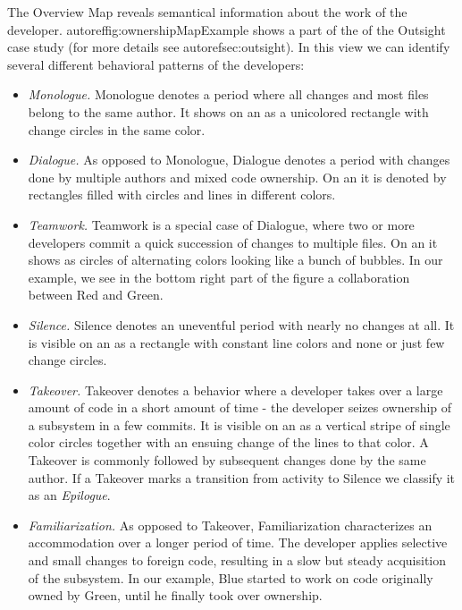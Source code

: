 \documentclass[10pt]{book}
\begin{document}
The Overview Map reveals semantical information about the work of the developer. autoref{fig:ownershipMapExample} shows a part of the \omap of the Outsight case study (for more details see  autoref{sec:outsight}). In this view we can identify several different behavioral patterns of the developers:

\begin{itemize}

\item \emph{Monologue.} Monologue denotes a period where all changes and most files belong to the same author. It shows on an \omap as a unicolored rectangle with change circles in the same color.

\item \emph{Dialogue.} As opposed to Monologue, Dialogue denotes a period with changes done by multiple authors and mixed code ownership. On an \omap it is denoted by rectangles filled with circles and lines in different colors.

\item \emph{Teamwork.} Teamwork is a special case of Dialogue, where two or more developers commit a quick succession of changes to multiple files. On an \omap it shows as circles of alternating colors looking like a bunch of bubbles. In our example, we see in the bottom right part of the figure a collaboration between Red and Green.

\item \emph{Silence.} Silence denotes an uneventful period with nearly no changes at all. It is visible on an \omap as a rectangle with constant line colors and none or just few change circles.

\item \emph{Takeover.} Takeover denotes a behavior where a developer takes over a large amount of code in a short amount of time \-- \ie the developer seizes ownership of a subsystem in a few commits. It is visible on an \omap as a vertical stripe of single color circles together with an ensuing change of the lines to that color. A Takeover is commonly followed by subsequent changes done by the same author. If a Takeover marks a transition from activity to Silence we classify it as an \emph{Epilogue}.

\item \emph{Familiarization.} As opposed to Takeover, Familiarization characterizes an accommodation over a longer period of time. The developer applies selective and small changes to foreign code, resulting in a slow but steady acquisition of the subsystem. In our example, Blue started to work on code originally owned by Green, until he finally took over ownership.


\end{itemize}
\end{document}
